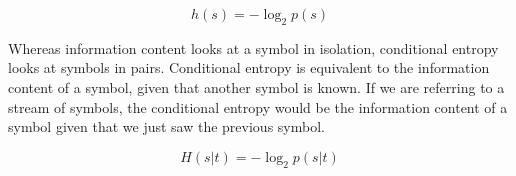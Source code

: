 \begin{equation}
  \label{equation:information-content}
  h(s) = - \log_2 p(s)
\end{equation}

Whereas information content looks at a symbol in isolation, conditional entropy looks at symbols in pairs.  Conditional entropy is equivalent to the information content of a symbol, given that another symbol is known.  If we are referring to a stream of symbols, the conditional entropy would be the information content of a symbol given that we just saw the previous symbol.

\begin{equation}
  \label{equation:conditional-entropy}
  H(s|t) = -\log_2 p(s|t)
\end{equation}


